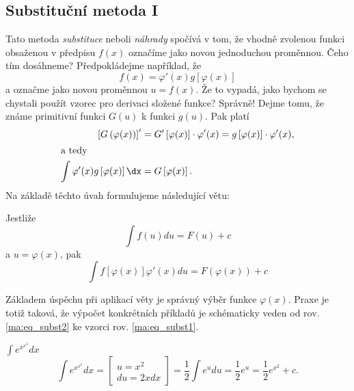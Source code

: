       
  
    \subsection{Substituční metoda I}
      Tato metoda \emph{substituce} neboli \emph{náhrady} spočívá v tom, že vhodně zvolenou funkci 
      obsaženou v předpisu \(f(x)\) označíme jako novou jednoduchou proměnnou. Čeho tím dosáhneme? 
      Předpokládejme například, že \[f(x)=\varphi'(x)g[\varphi(x)]\] a označme jako novou proměnnou 
      \(u = f(x)\). Že to vypadá, jako bychom se chystali použít vzorec pro derivaci složené 
      funkce? Správně! Dejme tomu, že známe primitivní funkci \(G(u)\) k funkci \(g(u)\). Pak platí
      \begin{align*}
       \left[G\left(\varphi(x)\right)\right]' 
          &= G'\left[\varphi(x)\right]\cdot\varphi'(x) =
             g\left[\varphi(x)\right]\cdot\varphi'(x),     \\
          \shortintertext{a tedy}
       \int \varphi'(x) g\left[\varphi(x)\right]\dx 
          &=  G\left[\varphi(x)\right]. 
      \end{align*}      
      Na základě těchto úvah formulujeme následující větu:
      \begin{lemma}
        Jestliže
        \begin{equation}\label{ma:eq_subst1}
          \int{f(u)du}=F(u)+c
        \end{equation}
        a $u=\varphi(x)$, pak
        \begin{equation}\label{ma:eq_subst2}
            \int{f[\varphi(x)]\varphi'(x)du}=F(\varphi(x))+c
        \end{equation}
      \end{lemma}
  
      Základem úspěchu při aplikací věty je správný výběr funkce $\varphi(x)$. Praxe je totiž
      taková, že výpočet konkrétních příkladů je schématicky veden od rov. \ref{ma:eq_subst2} ke
      vzorci rov. \ref{ma:eq_subst1}.

      
      
      \begin{example}\label{ma:ex_sub_metoda}$\displaystyle\int{e^{x^{x^2}}dx}$
        \begin{equation*}
            \int{e^{x^{x^2}}dx}=
               \left[
                 \begin{array}{c}u=x^2 \\ du=2xdx\end{array}
               \right]=
               \frac{1}{2}\int{e^udu}=\frac{1}{2}e^u=\frac{1}{2}e^{x^2} + c.
        \end{equation*}
      \end{example}
      
